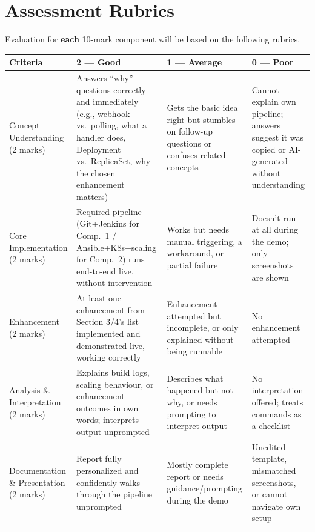 \documentclass[12pt,a4paper]{article}
\newcommand{\sizeTwelve}{\fontsize{12pt}{14.5pt}\selectfont}  %
\begin{document}
\newpage

\section*{Assessment Rubrics}
{\sizeTwelve Evaluation for \textbf{each} 10-mark component will be based on the following rubrics.\par}

\vspace{0.4cm}

{\sizeTwelve
\setlength{\tabcolsep}{4pt}
\renewcommand{\arraystretch}{1.25}
\begin{longtable}{|>{\raggedright\arraybackslash}p{3.0cm}|>{\raggedright\arraybackslash}p{3.5cm}|>{\raggedright\arraybackslash}p{3.5cm}|>{\raggedright\arraybackslash}p{3.5cm}|}
\hline
\textbf{Criteria} & \textbf{2 --- Good} & \textbf{1 --- Average} & \textbf{0 --- Poor} \\
\hline
\endhead
Concept Understanding (2 marks) & Answers ``why'' questions correctly and immediately (e.g., webhook vs.\ polling, what a handler does, Deployment vs.\ ReplicaSet, why the chosen enhancement matters) & Gets the basic idea right but stumbles on follow-up questions or confuses related concepts & Cannot explain own pipeline; answers suggest it was copied or AI-generated without understanding \\
\hline
Core Implementation (2 marks) & Required pipeline (Git+Jenkins for Comp.\ 1 / Ansible+K8s+scaling for Comp.\ 2) runs end-to-end live, without intervention & Works but needs manual triggering, a workaround, or partial failure & Doesn't run at all during the demo; only screenshots are shown \\
\hline
Enhancement (2 marks) & At least one enhancement from Section 3/4's list implemented and demonstrated live, working correctly & Enhancement attempted but incomplete, or only explained without being runnable & No enhancement attempted \\
\hline
Analysis \& Interpretation (2 marks) & Explains build logs, scaling behaviour, or enhancement outcomes in own words; interprets output unprompted & Describes what happened but not why, or needs prompting to interpret output & No interpretation offered; treats commands as a checklist \\
\hline
Documentation \& Presentation (2 marks) & Report fully personalized and confidently walks through the pipeline unprompted & Mostly complete report or needs guidance/prompting during the demo & Unedited template, mismatched screenshots, or cannot navigate own setup \\
\hline
\end{longtable}
\par}
\end{document}
